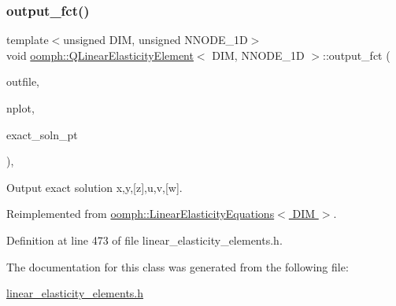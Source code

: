 \subsubsection{\texorpdfstring{output\+\_\+fct()}{output\_fct()}}
{\footnotesize\ttfamily template$<$unsigned D\+IM, unsigned N\+N\+O\+D\+E\+\_\+1D$>$ \\
void \hyperlink{classoomph_1_1QLinearElasticityElement}{oomph\+::\+Q\+Linear\+Elasticity\+Element}$<$ D\+IM, N\+N\+O\+D\+E\+\_\+1D $>$\+::output\+\_\+fct (\begin{DoxyParamCaption}\item[{std\+::ostream \&}]{outfile,  }\item[{const unsigned \&}]{nplot,  }\item[{\hyperlink{classoomph_1_1FiniteElement_a690fd33af26cc3e84f39bba6d5a85202}{Finite\+Element\+::\+Steady\+Exact\+Solution\+Fct\+Pt}}]{exact\+\_\+soln\+\_\+pt }\end{DoxyParamCaption})\hspace{0.3cm}{\ttfamily [inline]}, {\ttfamily [virtual]}}



Output exact solution x,y,\mbox{[}z\mbox{]},u,v,\mbox{[}w\mbox{]}. 



Reimplemented from \hyperlink{classoomph_1_1LinearElasticityEquations_a039f66979684d41503f45cdbf87cfc3b}{oomph\+::\+Linear\+Elasticity\+Equations$<$ D\+I\+M $>$}.



Definition at line 473 of file linear\+\_\+elasticity\+\_\+elements.\+h.



The documentation for this class was generated from the following file\+:\begin{DoxyCompactItemize}
\item 
\hyperlink{linear__elasticity__elements_8h}{linear\+\_\+elasticity\+\_\+elements.\+h}\end{DoxyCompactItemize}
